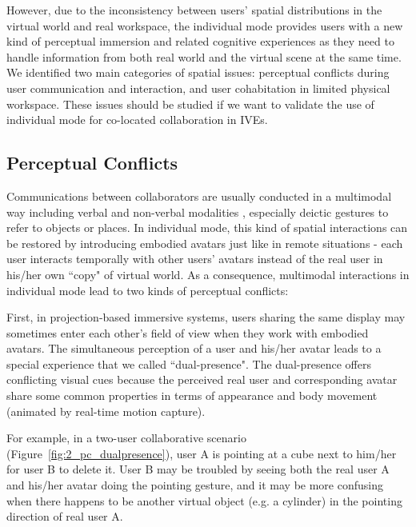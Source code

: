 However, due to the inconsistency between users' spatial distributions in the virtual world and real workspace, the individual mode provides users with a new kind of perceptual immersion and related cognitive experiences as they need to handle information from both real world and the virtual scene at the same time. We identified two main categories of spatial issues: perceptual conflicts during user communication and interaction, and user cohabitation in limited physical workspace. These issues should be studied if we want to validate the use of individual mode for co-located collaboration in IVEs. 


\subsection{Perceptual Conflicts}
Communications between collaborators are usually conducted in a multimodal way \citep{Paggio2005Multimodal} including verbal and non-verbal modalities \citep{Ennis2010Seeing, Dodds2011Talk}, especially deictic gestures to refer to objects or places. In individual mode, this kind of spatial interactions can be restored by introducing embodied avatars just like in remote situations - each user interacts temporally with other users' avatars instead of the real user in his/her own ``copy" of virtual world.  As a consequence, multimodal interactions in individual mode lead to two kinds of perceptual conflicts:

First, in projection-based immersive systems, users sharing the same display may sometimes enter each other's field of view when they work with embodied avatars. The simultaneous perception of a user and his/her avatar leads to a special experience that we called ``dual-presence". The dual-presence offers conflicting visual cues because the perceived real user and corresponding avatar share some common properties in terms of appearance and body movement (animated by real-time motion capture).

For example, in a two-user collaborative scenario (Figure~\ref{fig:2_pc_dualpresence}), user A is pointing at a cube next to him/her for user B to delete it. User B may be troubled by seeing both the real user A and his/her avatar doing the pointing gesture, and it may be more confusing when there happens to be another virtual object (e.g. a cylinder) in the pointing direction of real user A.

